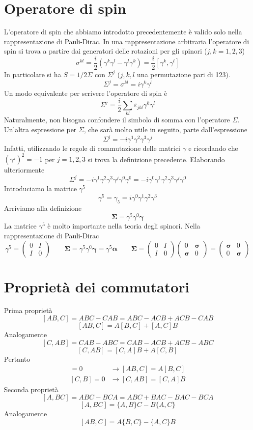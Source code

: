 \section{Operatore di spin}
L'operatore di spin che abbiamo introdotto precedentemente è valido solo nella rappresentazione di Pauli-Dirac. In una rappresentazione arbitraria l'operatore di spin si trova a partire dai generatori delle rotazioni per gli spinori ($j,k=1,2,3$)
$$
\sigma^{kl} = \frac{i}{2}(\gamma^k \gamma^l - \gamma^l \gamma^k) = \frac{i}{2}[\gamma^k, \gamma^l]
$$
In particolare si ha $S=1/2\Sigma$ con $\Sigma^j$ ($j,k,l$ una permutazione pari di 123).
$$
\Sigma^j = \sigma^{kl} = i\gamma^k \gamma^l
$$
Un modo equivalente per scrivere l'operatore di spin è
$$
\Sigma^j = \frac{i}{2} \sum_{kl} \varepsilon_{jkl} \gamma^k \gamma^l
$$
Naturalmente, non bisogna confondere il simbolo di somma con l'operatore $\Sigma$. Un'altra espressione per $\Sigma$, che sarà molto utile in seguito, parte dall'espressione
$$
\Sigma^j = -i\gamma^1\gamma^2\gamma^3\gamma^j
$$
Infatti, utilizzando le regole di commutazione delle matrici $\gamma$ e ricordando che $(\gamma^j)^2=-1$ per $j=1,2,3$ si trova la definizione precedente. Elaborando ulteriormente
$$
\Sigma^j = -i\gamma^1\gamma^2\gamma^3\gamma^j\gamma^0\gamma^0 = -i\gamma^0\gamma^1\gamma^2\gamma^3\gamma^j\gamma^0
$$
Introduciamo la matrice $\gamma^5$
$$
\gamma^5 = \gamma_5 = i\gamma^0\gamma^1\gamma^2\gamma^3
$$
Arriviamo alla definizione
$$
\boldsymbol{\Sigma} = \gamma^5 \gamma^0 \boldsymbol{\gamma}
$$
La matrice $\gamma^5$ è molto importante nella teoria degli spinori. Nella rappresentazione di Pauli-Dirac
$$
\gamma^5 = \begin{pmatrix} 0 & I \\ I & 0 \end{pmatrix} \qquad \boldsymbol{\Sigma} = \gamma^5 \gamma^0 \boldsymbol{\gamma} = \gamma^5 \boldsymbol{\alpha} \qquad \boldsymbol{\Sigma} = \begin{pmatrix} 0 & I \\ I & 0 \end{pmatrix} \begin{pmatrix} 0 & \boldsymbol{\sigma} \\ \boldsymbol{\sigma} & 0 \end{pmatrix} = \begin{pmatrix} \boldsymbol{\sigma} & 0 \\ 0 & \boldsymbol{\sigma} \end{pmatrix}
$$
\section{Proprietà dei commutatori}
Prima proprietà
$$
[AB,C] = ABC - CAB = ABC - ACB + ACB - CAB
$$
$$
[AB,C] = A[B,C] + [A,C]B
$$
Analogamente
$$
[C,AB] = CAB - ABC = CAB - ACB + ACB - ABC
$$
$$
[C,AB] = [C,A]B + A[C,B]
$$
Pertanto
\begin{align*}
[A,C] = 0 &\to [AB,C] = A[B,C] \\
[C,B] = 0 &\to [C,AB] = [C,A]B
\end{align*}
Seconda proprietà
$$
[A,BC] = ABC - BCA = ABC + BAC - BAC - BCA
$$
$$
[A,BC] = \{A,B\}C - B\{A,C\}
$$
Analogamente
$$
[AB,C] = A\{B,C\} - \{A,C\}B
$$
